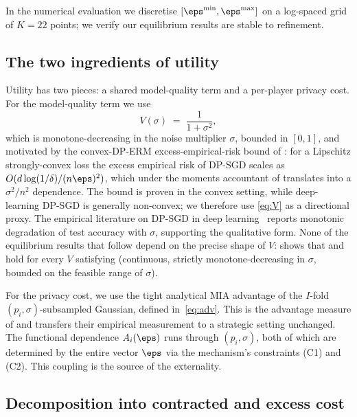In the numerical evaluation we discretise $[\eps^{\min},\eps^{\max}]$ on a
log-spaced grid of $K=22$ points; we verify our equilibrium results are
stable to refinement.

\subsection{The two ingredients of utility}

Utility has two pieces: a shared model-quality term and a per-player
privacy cost. For the model-quality term we use
\begin{equation}
V(\sigma) \;=\; \frac{1}{1 + \sigma^2},
\label{eq:V}
\end{equation}
which is monotone-decreasing in the noise multiplier $\sigma$, bounded in
$[0, 1]$, and motivated by the convex-DP-ERM excess-empirical-risk bound
of \citet{bassily2014private}: for a Lipschitz strongly-convex loss the
excess empirical risk of DP-SGD scales as $O(d \log(1/\delta)/(n\eps)^2)$,
which under the moments accountant of \citet{abadi2016deep} translates
into a $\sigma^2/n^2$ dependence. The bound is proven in the convex
setting, while deep-learning DP-SGD is generally non-convex; we therefore
use \eqref{eq:V} as a directional proxy. The empirical literature on
DP-SGD in deep learning~\cite{tramer2021private, abadi2016deep,
boenisch2023have} reports monotonic degradation of test accuracy with
$\sigma$, supporting the qualitative form. None of the equilibrium
results that follow depend on the precise shape of $V$:
 shows that  and
 hold for every $V$ satisfying
 (continuous, strictly monotone-decreasing in
$\sigma$, bounded on the feasible range of $\sigma$).

For the privacy cost, we use the tight analytical MIA advantage of the
$I$-fold $(p_i, \sigma)$-subsampled Gaussian, defined in~\eqref{eq:adv}.
This is the advantage measure of \citet{kaiser2026your} and transfers
their empirical measurement to a strategic setting unchanged. The
functional dependence $A_i(\boldsymbol{\eps})$ runs through $(p_i,
\sigma)$, both of which are determined by the entire vector
$\boldsymbol{\eps}$ via the mechanism's constraints (C1) and (C2). This
coupling is the source of the externality.

\subsection{Decomposition into contracted and excess cost}
\label{sec:decomposition}

